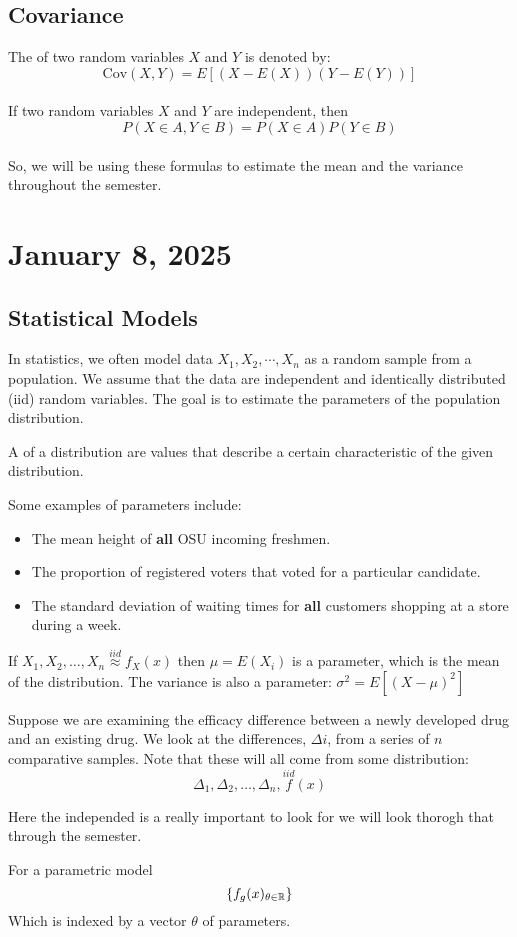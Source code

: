 \documentclass[11pt]{article}
\begin{document}
\subsection{Covariance}

The  of two random variables $X$ and $Y$ is denoted by:
\[
    \text{Cov}(X, Y) = E\left[(X - E(X))(Y - E(Y))\right]
\]
\\
If two random variables $X$ and $Y$ are independent, then
\[
    P(X\in A, Y \in B) = P(X\in A)P(Y\in B)
\]
\\
So, we will be using these formulas to estimate the mean and the variance throughout the semester.
\section{January 8, 2025}
\subsection{Statistical Models}
In statistics, we often model data $X_1, X_2, \cdots, X_n$ as a random sample
from a population. We assume that the data are independent and identically
distributed (iid) random variables. The goal is to estimate the parameters of
the population distribution.

\begin{definition}
    A  of a distribution are values that describe a certain characteristic of the given distribution.
\end{definition}
Some examples of parameters include:
\begin{itemize}
    \item The mean height of \textbf{all} OSU incoming freshmen.
    \item The proportion of registered voters that voted for a particular candidate.
    \item The standard deviation of waiting times for \textbf{all} customers shopping at
          a store during a week.
\end{itemize}

\begin{fact}
    If $X_1, X_2, \ldots, X_n \overset{iid}{\approx} f_X(x)$ then \(\mu  = E(X_i)\) is a parameter, which is the mean of the distribution. The variance is also a parameter: \(\sigma^2 = E[(X - \mu)^2]\)
\end{fact}

\begin{example}
    Suppose we are examining the efficacy difference between a newly developed drug and an existing drug. We look at the differences, $\Delta i$, from a series of $n$ comparative samples. Note that these will all come from some distribution:
    \[ \Delta_1, \Delta_2, \ldots, \Delta_n, \overset{iid} f(x)\]

\end{example}
\begin{fact}
    Here the independed is a really important to look for we will look thorogh that through the semester.
\end{fact}
For a parametric model\[\{f_g(x)_{\theta \in \mathbb R}\}\]
Which is indexed by a vector $\theta$ of parameters.
\end{document}
